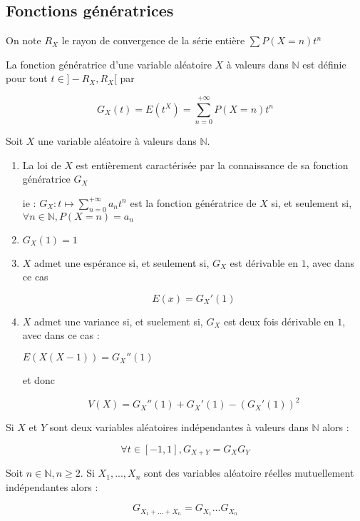 \documentclass[a4paper,12pt]{book}
\newcommand{\Def}[2]{\begin{tcolorbox}[colback=white,colframe=red!10!green!20!blue!75!, title=Définition : #1]#2\end{tcolorbox}}
\newcommand{\Thr}[2]{\begin{tcolorbox}[sharp corners, colback=white,colframe=red!10!blue!30!green!75!, title=Théorème : #1]#2\end{tcolorbox}}
\def\N{\mathbb{N}}
\begin{document}
\subsection{Fonctions génératrices}
\Def{}{On note $R_X$ le rayon de convergence de la série entière $\sum P(X=n)t^n$
\par La fonction génératrice d'une variable aléatoire $X$ à valeurs dans $\N$ est définie pour tout $t\in]-R_X,R_X[$ par
\par $$G_X(t)=E(t^X)=\sum\limits_{n=0}^{+\infty}P(X=n)t^n$$}
\Thr{}{Soit $X$ une variable aléatoire à valeurs dans $\N$.\begin{enumerate}
\item La loi de $X$ est entièrement caractérisée par la connaissance de sa fonction génératrice $G_X$
\par ie : $G_X:t\mapsto \sum\limits_{n=0}^{+\infty}a_nt^n$ est la fonction génératrice de $X$ si, et seulement si, $\forall n\in \N, P(X=n)=a_n$
\item $G_X(1)=1$
\item $X$ admet une espérance si, et seulement si, $G_X$ est dérivable en $1$, avec dans ce cas
\par $$E(x) =G_X'(1)$$
\item $X$ admet une variance si, et suelement si, $G_X$ est deux fois dérivable en $1$, avec dans ce cas :\par\begin{center}$E(X(X-1))=G_X''(1)$\end{center}
\par et donc
\par $$V(X)=G_X''(1)+G_X'(1)-(G_X'(1))^2$$
\end{enumerate}}
\Thr{}{Si $X$ et $Y$ sont deux variables aléatoires indépendantes à valeurs dans $\N$ alors :
\par $$\forall t\in[-1,1], G_{X+Y}=G_XG_Y$$
\par Soit $n\in\N, n\geq 2$. Si $X_1,...,X_n$ sont des variables aléatoire réelles mutuellement indépendantes alors :
\par $$G_{X_1+...+X_n}=G_{X_1}...G_{X_n}$$}
\end{document}

